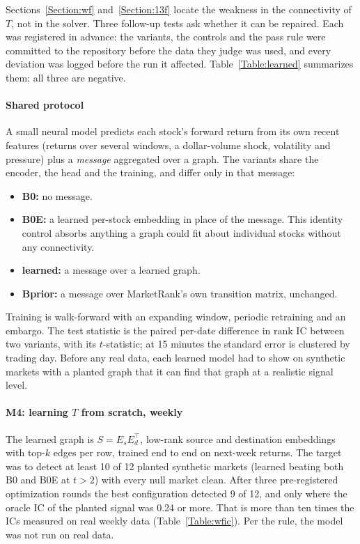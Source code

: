 \documentclass[preprint,3p,twocolumn]{elsarticle}
\newcommand{\MR}{MarketRank}
\begin{document}
Sections~\ref{Section:wf} and~\ref{Section:13f} locate the weakness in the connectivity of $T$, not in the solver. Three follow-up tests ask whether it can be repaired. Each was registered in advance: the variants, the controls and the pass rule were committed to the repository before the data they judge was used, and every deviation was logged before the run it affected. Table~\ref{Table:learned} summarizes them; all three are negative.

\paragraph{Shared protocol} A small neural model predicts each stock's forward return from its own recent features (returns over several windows, a dollar-volume shock, volatility and pressure) plus a \emph{message} aggregated over a graph. The variants share the encoder, the head and the training, and differ only in that message:
\begin{itemize}
\item \textbf{B0:} no message.
\item \textbf{B0E:} a learned per-stock embedding in place of the message. This identity control absorbs anything a graph could fit about individual stocks without any connectivity.
\item \textbf{learned:} a message over a learned graph.
\item \textbf{Bprior:} a message over \MR's own transition matrix, unchanged.
\end{itemize}
Training is walk-forward with an expanding window, periodic retraining and an embargo. The test statistic is the paired per-date difference in rank IC between two variants, with its $t$-statistic; at 15 minutes the standard error is clustered by trading day. Before any real data, each learned model had to show on synthetic markets with a planted graph that it can find that graph at a realistic signal level.

\paragraph{M4: learning $T$ from scratch, weekly} The learned graph is $S=E_sE_d^\top$, low-rank source and destination embeddings with top-$k$ edges per row, trained end to end on next-week returns. The target was to detect at least 10 of 12 planted synthetic markets (learned beating both B0 and B0E at $t>2$) with every null market clean. After three pre-registered optimization rounds the best configuration detected 9 of 12, and only where the oracle IC of the planted signal was 0.24 or more. That is more than ten times the ICs measured on real weekly data (Table~\ref{Table:wfic}). Per the rule, the model was not run on real data.
\end{document}
